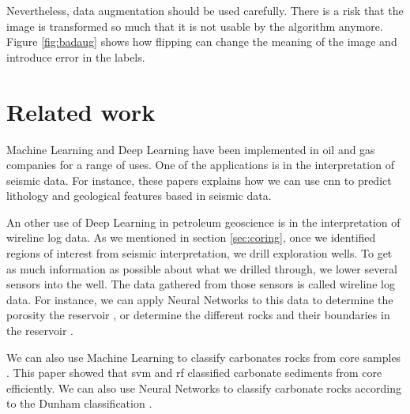 Nevertheless, data augmentation should be used carefully. There is a risk that the image is transformed so much that it is not usable by the algorithm anymore. Figure \ref{fig:badaug} shows how flipping can change the meaning of the image and introduce error in the labels. 
\section{Related work}
Machine Learning and Deep Learning have been implemented in oil and gas companies for a range of uses. One of the applications is in the interpretation of seismic data. For instance, these papers \cite{dlseismiclitho, dlseismicfeatures} explains how we can use \gls{cnn} to predict lithology and geological features based in seismic data.  

An other use of Deep Learning in petroleum geoscience is in the interpretation of wireline log data. As we mentioned in section \ref{sec:coring}, once we identified regions of interest from seismic interpretation, we drill exploration wells. To get as much information as possible about what we drilled through, we lower several sensors into the well. The data gathered from those sensors is called wireline log data. For instance, we can apply Neural Networks to this data to determine the porosity the reservoir \cite{dlwirelineporo}, or determine the different rocks and their boundaries in the reservoir \cite{dlwirelinefacies}. 

We can also use Machine Learning to classify carbonates rocks from core samples \cite{carbo}. This paper showed that \gls{svm} and \gls{rf} classified carbonate sediments from core efficiently. We can also use Neural Networks to classify carbonate rocks according to the Dunham classification \cite{dltexture}. 
